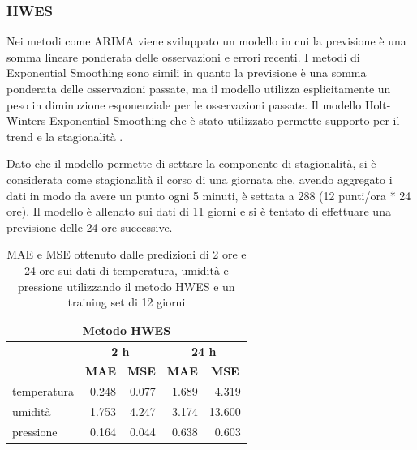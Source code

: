 \documentclass{article}
\begin{document}
\subsubsection{HWES}

Nei metodi come ARIMA viene sviluppato un modello in cui la previsione è una somma lineare ponderata delle osservazioni e errori recenti. I metodi di Exponential Smoothing sono simili in quanto la previsione è una somma ponderata delle osservazioni passate, ma il modello utilizza esplicitamente un peso in diminuzione esponenziale per le osservazioni passate. Il modello Holt-Winters Exponential Smoothing che è stato utilizzato permette supporto per il trend e la stagionalità \cite{hwes}.

Dato che il modello permette di settare la componente di stagionalità, si è considerata come stagionalità il corso di una giornata che, avendo aggregato i dati in modo da avere un punto ogni 5 minuti, è settata a 288 (12 punti/ora * 24 ore).
Il modello è allenato sui dati di 11 giorni e si è tentato di effettuare una previsione delle 24 ore successive.


\begin{table}
\centering
\begin{tabular}{l|r|r|r|r}
\multicolumn{5}{c}{{\cellcolor[rgb]{0.875,0.875,0.875}} Metodo HWES}                                                                                                                         \\ 
\hline
\rowcolor[rgb]{0.753,0.753,0.753}             & \multicolumn{2}{c|}{\textbf{ 2 h}}                                    & \multicolumn{2}{c}{\textbf{24 h }}                                    \\
\rowcolor[rgb]{0.753,0.753,0.753}             & \multicolumn{1}{c|}{\textbf{MAE}} & \multicolumn{1}{c|}{\textbf{MSE}} & \multicolumn{1}{c|}{\textbf{MAE}} & \multicolumn{1}{c}{\textbf{MSE}}  \\ 
\hline
\rowcolor[rgb]{0.875,0.875,0.875} temperatura & 0.248                             & 0.077                             & 1.689                             & 4.319                             \\
umidità                                       & 1.753                             & 4.247                             & 3.174                             & 13.600                            \\
\rowcolor[rgb]{0.875,0.875,0.875} pressione   & 0.164                             & 0.044                             & 0.638                             & 0.603                            
\end{tabular}
\caption{MAE e MSE ottenuto dalle predizioni di 2 ore e 24 ore sui dati di temperatura, umidità e pressione utilizzando il metodo HWES e un training set di 12 giorni}
\label{tab:hwes}
\end{table}
\end{document}
